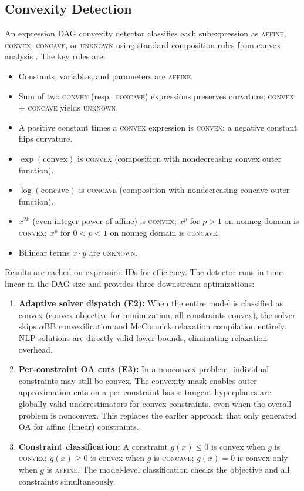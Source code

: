\documentclass[12pt,preprint]{article}
\begin{document}
\subsection{Convexity Detection}
\label{org-convexity-detection}
An expression DAG convexity detector classifies each subexpression as \textsc{affine}, \textsc{convex}, \textsc{concave}, or \textsc{unknown} using standard composition rules from convex analysis \cite{Boyd2004}. The key rules are:

\begin{itemize}
\item Constants, variables, and parameters are \textsc{affine}.
\item Sum of two \textsc{convex} (resp.~\textsc{concave}) expressions preserves curvature; \textsc{convex} + \textsc{concave} yields \textsc{unknown}.
\item A positive constant times a \textsc{convex} expression is \textsc{convex}; a negative constant flips curvature.
\item $\exp(\text{convex})$ is \textsc{convex} (composition with nondecreasing convex outer function).
\item $\log(\text{concave})$ is \textsc{concave} (composition with nondecreasing concave outer function).
\item $x^{2k}$ (even integer power of affine) is \textsc{convex}; $x^p$ for $p > 1$ on nonneg domain is \textsc{convex}; $x^p$ for $0 < p < 1$ on nonneg domain is \textsc{concave}.
\item Bilinear terms $x \cdot y$ are \textsc{unknown}.
\end{itemize}

Results are cached on expression IDs for efficiency. The detector runs in time linear in the DAG size and provides three downstream optimizations:

\begin{enumerate}
\item \textbf{Adaptive solver dispatch (E2):} When the entire model is classified as convex (convex objective for minimization, all constraints convex), the solver skips $\alpha$BB convexification and McCormick relaxation compilation entirely. NLP solutions are directly valid lower bounds, eliminating relaxation overhead.

\item \textbf{Per-constraint OA cuts (E3):} In a nonconvex problem, individual constraints may still be convex. The convexity mask enables outer approximation cuts \cite{Duran1986} on a per-constraint basis: tangent hyperplanes are globally valid underestimators for convex constraints, even when the overall problem is nonconvex. This replaces the earlier approach that only generated OA for affine (linear) constraints.

\item \textbf{Constraint classification:} A constraint $g(x) \le 0$ is convex when $g$ is \textsc{convex}; $g(x) \ge 0$ is convex when $g$ is \textsc{concave}; $g(x) = 0$ is convex only when $g$ is \textsc{affine}. The model-level classification checks the objective and all constraints simultaneously.
\end{enumerate}
\end{document}
